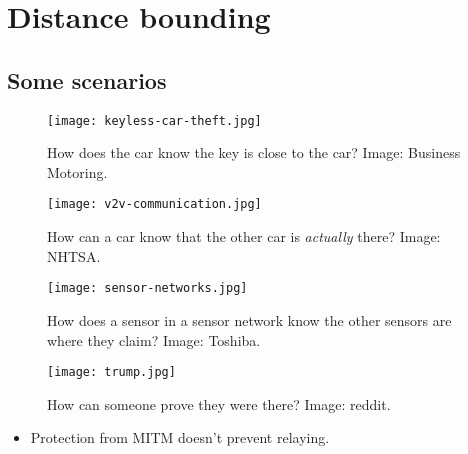 \mode*

\section{Distance bounding}

\subsection{Some scenarios}

\begin{frame}
  \begin{figure}
    \texttt{[image: keyless-car-theft.jpg]}
    \caption{%
      How does the car know the key is close to the car?
      Image: Business Motoring.
    }
  \end{figure}
\end{frame}

\begin{frame}
  \begin{figure}
    \texttt{[image: v2v-communication.jpg]}
    \caption{%
      How can a car know that the other car is \emph{actually} there?
      Image: NHTSA.
    }
  \end{figure}
\end{frame}

\begin{frame}
  \begin{figure}
    \texttt{[image: sensor-networks.jpg]}
    \caption{%
      How does a sensor in a sensor network know the other sensors are where 
      they claim?
      Image: Toshiba.
    }
  \end{figure}
\end{frame}

\begin{frame}
  \begin{figure}
    \texttt{[image: trump.jpg]}
    \caption{%
      How can someone prove they were there?
      Image: reddit.
    }%
  \end{figure}
\end{frame}

\begin{frame}
  \begin{remark}
    \begin{itemize}
      \item Protection from \acs{MITM} doesn't prevent relaying.
    \end{itemize}
  \end{remark}
\end{frame}

